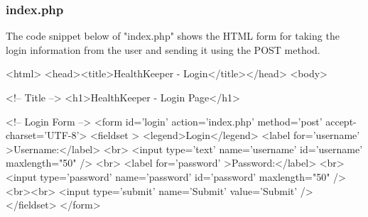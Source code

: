 \documentclass{article}
\begin{document}
\subsubsection{index.php}
The code snippet below of "index.php" shows the HTML form for taking the login information from the user and sending it using the POST method.
\begin{php}
<html>
<head><title>HealthKeeper - Login</title></head>
<body>

<!-- Title -->
<h1>HealthKeeper - Login Page</h1>

<!-- Login Form -->
<form id='login' action='index.php' method='post' 
accept-charset='UTF-8'>
<fieldset >
<legend>Login</legend>
<label for='username' >Username:</label>
<br>
<input type='text' name='username' id='username'  
maxlength="50" />
<br>
<label for='password' >Password:</label>
<br>
<input type='password' name='password' id='password' 
maxlength="50" />
<br><br>
<input type='submit' name='Submit' value='Submit' />
</fieldset>
</form>
\end{php}
\end{document}
